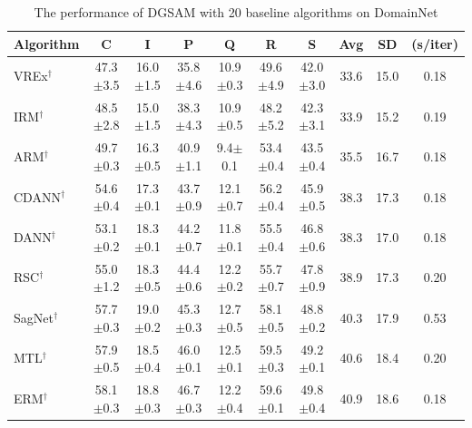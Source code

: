 \documentclass{article}
\theoremstyle{plain}
\theoremstyle{definition}
\theoremstyle{remark}
\begin{document}
\begin{table}[!ht]
\centering
\small
\caption{The performance of DGSAM with 20 baseline algorithms on DomainNet}
\begin{tabular}{l|cccccc|ccc}
\hline
Algorithm        & C    & I    & P   & Q   & R   & S    & Avg   & SD   & (s/iter) \\ \toprule
VREx\(^\dag\) \cite{krueger2021vrex} & {47.3\scriptsize$\pm$3.5} & {16.0\scriptsize$\pm$1.5} & {35.8\scriptsize$\pm$4.6} & {10.9\scriptsize$\pm$0.3} & {49.6\scriptsize$\pm$4.9} & {42.0\scriptsize$\pm$3.0} & 33.6 & 15.0 & 0.18 \\
IRM\(^\dag\) \cite{arjovsky2019irm} & {48.5\scriptsize$\pm$2.8} & {15.0\scriptsize$\pm$1.5} & {38.3\scriptsize$\pm$4.3} & {10.9\scriptsize$\pm$0.5} & {48.2\scriptsize$\pm$5.2} & {42.3\scriptsize$\pm$3.1} & 33.9 & 15.2 & 0.19 \\
ARM\(^\dag\) \cite{zhang2021arm} & {49.7\scriptsize$\pm$0.3} & {16.3\scriptsize$\pm$0.5} & {40.9\scriptsize$\pm$1.1} & {9.4\scriptsize$\pm$0.1} & {53.4\scriptsize$\pm$0.4} & {43.5\scriptsize$\pm$0.4} & 35.5 & 16.7 & 0.18 \\
CDANN\(^\dag\) \cite{li2018cdann} & {54.6\scriptsize$\pm$0.4} & {17.3\scriptsize$\pm$0.1} & {43.7\scriptsize$\pm$0.9} & {12.1\scriptsize$\pm$0.7} & {56.2\scriptsize$\pm$0.4} & {45.9\scriptsize$\pm$0.5} & 38.3 & 17.3 & 0.18 \\
DANN\(^\dag\) \cite{ganin2016dann} & {53.1\scriptsize$\pm$0.2} & {18.3\scriptsize$\pm$0.1} & {44.2\scriptsize$\pm$0.7} & {11.8\scriptsize$\pm$0.1} & {55.5\scriptsize$\pm$0.4} & {46.8\scriptsize$\pm$0.6} & 38.3 & 17.0 & 0.18 \\
RSC\(^\dag\) \cite{huang2020rsc} & {55.0\scriptsize$\pm$1.2} & {18.3\scriptsize$\pm$0.5} & {44.4\scriptsize$\pm$0.6} & {12.2\scriptsize$\pm$0.2} & {55.7\scriptsize$\pm$0.7} & {47.8\scriptsize$\pm$0.9} & 38.9 & 17.3 & 0.20 \\
SagNet\(^\dag\) \cite{nam2021sagnet} & {57.7\scriptsize$\pm$0.3} & {19.0\scriptsize$\pm$0.2} & {45.3\scriptsize$\pm$0.3} & {12.7\scriptsize$\pm$0.5} & {58.1\scriptsize$\pm$0.5} & {48.8\scriptsize$\pm$0.2} & 40.3 & 17.9 & 0.53 \\
MTL\(^\dag\) \cite{blanchard2021mtl} & {57.9\scriptsize$\pm$0.5} & {18.5\scriptsize$\pm$0.4} & {46.0\scriptsize$\pm$0.1} & {12.5\scriptsize$\pm$0.1} & {59.5\scriptsize$\pm$0.3} & {49.2\scriptsize$\pm$0.1} & 40.6 & 18.4 & 0.20 \\
ERM\(^\dag\) & {58.1\scriptsize$\pm$0.3} & {18.8\scriptsize$\pm$0.3} & {46.7\scriptsize$\pm$0.3} & {12.2\scriptsize$\pm$0.4} & {59.6\scriptsize$\pm$0.1} & {49.8\scriptsize$\pm$0.4} & 40.9 & 18.6 & 0.18 \\

\end{tabular}
\end{table}
\end{document}
